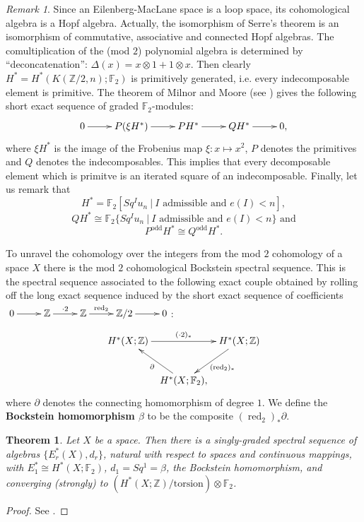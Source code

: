 \documentclass[11pt,a4paper]{amsart}
\theoremstyle{plain}
\newtheorem{thm}{Theorem}[section]
\theoremstyle{definition}
\theoremstyle{remark}
\newtheorem*{rem}{Remark}
\DeclareMathOperator{\red}{red}
\newcommand{\Z}{\mathbb{Z}}
\newcommand{\F}{\mathbb{F}}
\begin{document}
\begin{rem}
Since an Eilenberg-MacLane space is a loop space, its cohomological algebra is a Hopf algebra. Actually, the isomorphism of Serre's theorem is an isomorphism of commutative, associative and connected Hopf algebras. The comultiplication of the (mod $2$) polynomial algebra is determined by ``deconcatenation'': $\Delta(x)=x\otimes1+1\otimes x$. Then clearly $H^*=H^*(K(\Z/2,n);\F_2)$ is primitively generated, i.e. every indecomposable element is primitive. The theorem of Milnor and Moore (see \cite[Proposition 4.21, pp. 234-235]{MM-65}) gives the following short exact sequence of graded $\F_2$-modules:
$$\xymatrix{
0\ar[r] &P(\xi H^*)\ar[r] &PH^*\ar[r] &QH^*\ar[r] &0,
}$$ where $\xi H^*$ is the image of the Frobenius map $\xi:x\mapsto x^2$, $P$ denotes the primitives and $Q$ denotes the indecomposables. This implies that every decomposable element which is primitve is an iterated square of an indecomposable. Finally, let us remark that
$$
H^*=\F_2[Sq^I u_n\ |\ \text{$I$ admissible and $e(I)<n$}],
$$
$$
QH^*\cong\F_2\{Sq^I u_n\ |\ \text{$I$ admissible and $e(I)<n$}\}\text{ and}
$$
$$
P^\text{odd}H^*\cong Q^\text{odd}H^*.
$$
\end{rem}

To unravel the cohomology over the integers from the mod $2$ cohomology of a space $X$ there is the mod $2$ cohomological Bockstein spectral sequence. This is the spectral sequence associated to the following exact couple obtained by rolling off the long exact sequence induced by the short exact sequence of coefficients $\xymatrix{0\ar[r] &\Z\ar[r]^-{\cdot2} &\Z\ar[r]^-{\red_2} &\Z/2\ar[r] &0}$:
$$\xymatrix@C=0.2cm{
H^*(X;\Z)\ar[rr]^{(\cdot 2)_*} &&H^*(X;\Z)\ar[dl]^{(\red_2)_*}\\
&H^*(X;\F_2),\ar[ul]^{\partial}
}$$ where $\partial$ denotes the connecting homomorphism of degree $1$.
We define the {\bf Bockstein homomorphism $\beta$} to be the composite $(\red_2)_*\partial$.

\begin{thm}
Let $X$ be a space. Then there is a singly-graded spectral sequence of algebras $\{E_r^*(X),d_r\}$, natural with respect to spaces and continuous mappings, with $E_1^*\cong H^*(X;\F_2)$, $d_1=Sq^1=\beta$, the Bockstein homomorphism, and converging (strongly) to $(H^*(X;\Z)/\text{torsion})\otimes\F_2$.
\end{thm}

\begin{proof}
See \cite[Theorem 10.3, p. 459]{Mc-00}.
\end{proof}
\end{document}
